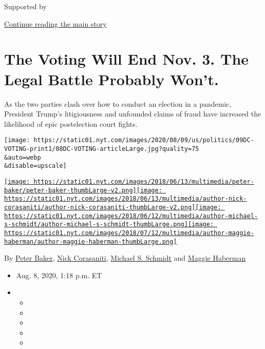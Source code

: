 Supported by

\protect\hyperlink{after-sponsor}{Continue reading the main story}

\hypertarget{the-voting-will-end-nov-3-the-legal-battle-probably-wont}{%
\section{The Voting Will End Nov. 3. The Legal Battle Probably
Won't.}\label{the-voting-will-end-nov-3-the-legal-battle-probably-wont}}

As the two parties clash over how to conduct an election in a pandemic,
President Trump's litigiousness and unfounded claims of fraud have
increased the likelihood of epic postelection court fights.

\texttt{[image: https://static01.nyt.com/images/2020/08/09/us/politics/09DC-VOTING-print1/08DC-VOTING-articleLarge.jpg?quality=75\\\&auto=webp\\\&disable=upscale]}

\href{https://www.nytimes.com/by/peter-baker}{\texttt{[image: https://static01.nyt.com/images/2018/06/13/multimedia/peter-baker/peter-baker-thumbLarge-v2.png]}}\href{https://www.nytimes.com/by/nick-corasaniti}{\texttt{[image: https://static01.nyt.com/images/2018/06/13/multimedia/author-nick-corasaniti/author-nick-corasaniti-thumbLarge-v2.png]}}\href{https://www.nytimes.com/by/michael-s-schmidt}{\texttt{[image: https://static01.nyt.com/images/2018/06/12/multimedia/author-michael-s-schmidt/author-michael-s-schmidt-thumbLarge.png]}}\href{https://www.nytimes.com/by/maggie-haberman}{\texttt{[image: https://static01.nyt.com/images/2018/07/12/multimedia/author-maggie-haberman/author-maggie-haberman-thumbLarge.png]}}

By \href{https://www.nytimes.com/by/peter-baker}{Peter Baker},
\href{https://www.nytimes.com/by/nick-corasaniti}{Nick Corasaniti},
\href{https://www.nytimes.com/by/michael-s-schmidt}{Michael S. Schmidt}
and \href{https://www.nytimes.com/by/maggie-haberman}{Maggie Haberman}

\begin{itemize}
\item
  Aug. 8, 2020, 1:18 p.m. ET
\item
  \begin{itemize}
  \item
  \item
  \item
  \item
  \item
  \end{itemize}
\end{itemize}

